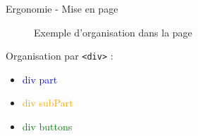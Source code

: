 \documentclass{beamer}
\begin{document}
\begin{frame}{\textcolor{bleu2}{\hspace{1cm} Ergonomie - Mise en page}}
	\begin{figure}
		\begin{center}
			\caption{Exemple d'organisation dans la page}
		\end{center}
	\end{figure}
	\hspace{0.2cm}Organisation par \texttt{<div>} :
	\begin{itemize}
		\item \textcolor{blue}{div part} 
		\item \textcolor{orange}{div subPart}
		\item \textcolor{green}{div buttons}
	\end{itemize}
\end{frame}
\end{document}
